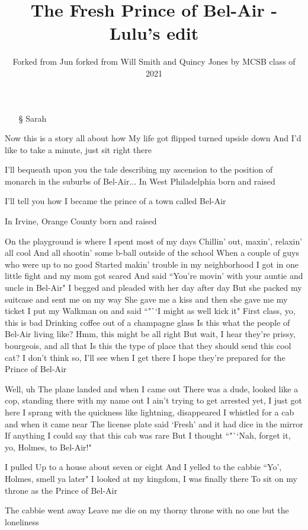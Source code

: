 \documentclass{article}
\title{The Fresh Prince of Bel-Air - Lulu's edit}
\author{Forked from Jun forked from Will Smith and Quincy Jones by MCSB class of 2021}
\begin{document}
\maketitle
\begin{itemize}
\item[\S] Sarah
\end{itemize}

Now this is a story all about how
My life got flipped turned upside down
And I'd like to take a minute, just sit right there

I'll bequeath upon you the tale describing my ascension to the position of monarch in the suburbs of Bel-Air...
In West Philadelphia born and raised

I'll tell you how I became the prince of a town called Bel-Air

In Irvine, Orange County born and raised

On the playground is where I spent most of my days
Chillin' out, maxin', relaxin' all cool
And all shootin' some b-ball outside of the school
When a couple of guys who were up to no good
Started makin' trouble in my neighborhood
I got in one little fight and my mom got scared
And said ``You're movin' with your auntie and uncle in Bel-Air"
I begged and pleaded with her day after day
But she packed my suitcase and sent me on my way
She gave me a kiss and then she gave me my ticket
I put my Walkman on and said ``"``I might as well kick it"
First class, yo, this is bad
Drinking coffee out of a champagne glass
Is this what the people of Bel-Air living like?
Hmm, this might be all right
But wait, I hear they're prissy, bourgeois, and all that
Is this the type of place that they should send this cool cat?
I don't think so, I'll see when I get there
I hope they're prepared for the Prince of Bel-Air

Well, uh
The plane landed and when I came out
There was a dude, looked like a cop, standing there with my name out
I ain't trying to get arrested yet, I just got here
I sprang with the quickness like lightning, disappeared
I whistled for a cab and when it came near
The license plate said `Fresh' and it had dice in the mirror
If anything I could say that this cab was rare
But I thought ``"``Nah, forget it, yo, Holmes, to Bel-Air!"

I pulled
Up to a house about seven or eight
And I yelled to the cabbie ``Yo', Holmes, smell ya later"
I looked at my kingdom, I was finally there
To sit on my throne as the Prince of Bel-Air

The cabbie went away
Leave me die on my thorny throne
with no one but the loneliness
\end{document}
